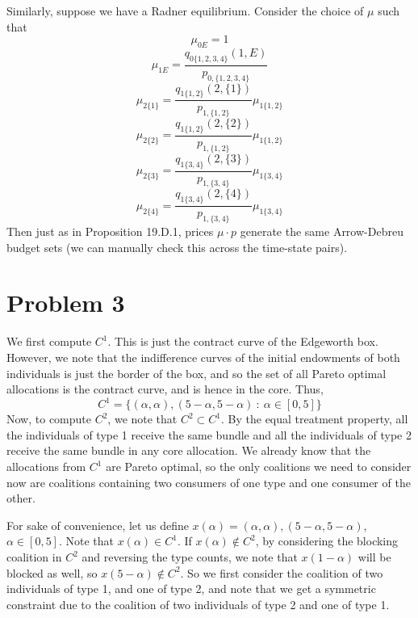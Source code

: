 \documentclass[10pt,letter]{article}
\begin{document}
\begin{enumerate}[label=(\alph*)]
  Similarly, suppose we have a Radner equilibrium. Consider the choice of $\mu$ such that
  \[ \mu_{0E} = 1 \]
  \[ \mu_{1E} = \frac{q_{0\{1,2,3,4\}}(1, E)}{p_{0,\{1,2,3,4\}}} \]
  \[ \mu_{2\{1\}} = \frac{q_{1\{1,2\}}(2, \{1\})}{p_{1,\{1,2\}}}\mu_{1\{1,2\}} \]
  \[ \mu_{2\{2\}} = \frac{q_{1\{1,2\}}(2, \{2\})}{p_{1,\{1,2\}}}\mu_{1\{1,2\}} \]
  \[ \mu_{2\{3\}} = \frac{q_{1\{3,4\}}(2, \{3\})}{p_{1,\{3,4\}}}\mu_{1\{3,4\}} \]
  \[ \mu_{2\{4\}} = \frac{q_{1\{3,4\}}(2, \{4\})}{p_{1,\{3,4\}}}\mu_{1\{3,4\}} \]
  Then just as in Proposition 19.D.1, prices $\mu \cdot p$ generate the same Arrow-Debreu budget sets (we can manually check this across the time-state pairs).
\end{enumerate}

\section*{Problem 3}
We first compute $C^1$. This is just the contract curve of the Edgeworth box. However, we note that the indifference curves of the initial endowments of both individuals is just the border of the box, and so the set of all Pareto optimal allocations is the contract curve, and is hence in the core. Thus,
\[ C^1 = \{ (\alpha, \alpha), (5 - \alpha, 5- \alpha) \ : \ \alpha \in [0,5] \} \]
Now, to compute $C^2$, we note that $C^2 \subset C^1$. By the equal treatment property, all the individuals of type 1 receive the same bundle and all the individuals of type 2 receive the same bundle in any core allocation. We already know that the allocations from $C^1$ are Pareto optimal, so the only coalitions we need to consider now are coalitions containing two consumers of one type and one consumer of the other.

For sake of convenience, let us define $x(\alpha) = (\alpha, \alpha), (5-\alpha, 5-\alpha)$, $\alpha \in [0,5]$. Note that $x(\alpha) \in C^1$.  If $ x(\alpha) \not \in C^2$, by considering the blocking coalition in $C^2$ and reversing the type counts, we note that $x(1-\alpha)$ will be blocked as well, so $x(5-\alpha) \not \in C^2$. So we first consider the coalition of two individuals of type 1, and one of type 2, and note that we get a symmetric constraint due to the coalition of two individuals of type 2 and one of type 1.
\end{document}
